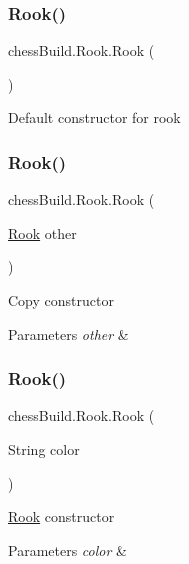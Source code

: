 \subsubsection{\texorpdfstring{Rook()}{Rook()}\hspace{0.1cm}{\footnotesize\ttfamily [1/4]}}
{\footnotesize\ttfamily chess\+Build.\+Rook.\+Rook (\begin{DoxyParamCaption}{ }\end{DoxyParamCaption})}

Default constructor for rook \mbox{\label{classchess_build_1_1_rook_a79c81af4e999db11ceb66e8049d33b16}} 
\subsubsection{\texorpdfstring{Rook()}{Rook()}\hspace{0.1cm}{\footnotesize\ttfamily [2/4]}}
{\footnotesize\ttfamily chess\+Build.\+Rook.\+Rook (\begin{DoxyParamCaption}\item[{\hyperlink{classchess_build_1_1_rook}{Rook}}]{other }\end{DoxyParamCaption})}

Copy constructor 
\begin{DoxyParams}{Parameters}
{\em other} & \\
\hline
\end{DoxyParams}
\mbox{\label{classchess_build_1_1_rook_aff5411564cfd90a16a74290124bbdae3}} 
\subsubsection{\texorpdfstring{Rook()}{Rook()}\hspace{0.1cm}{\footnotesize\ttfamily [3/4]}}
{\footnotesize\ttfamily chess\+Build.\+Rook.\+Rook (\begin{DoxyParamCaption}\item[{String}]{color }\end{DoxyParamCaption})}

\hyperlink{classchess_build_1_1_rook}{Rook} constructor 
\begin{DoxyParams}{Parameters}
{\em color} & \\
\hline
\end{DoxyParams}
\mbox{\label{classchess_build_1_1_rook_a1b2faa9ca40b7fed9172ffe0b15237d9}} 

